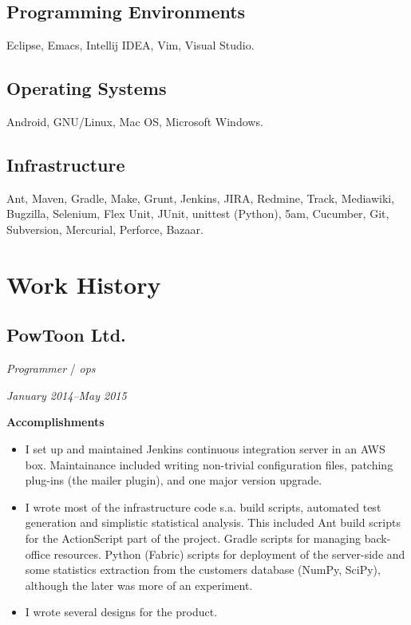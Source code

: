 \documentclass[11pt]{article}
\begin{document}
\subsection{Programming Environments}
\label{sec:orgheadline5}
Eclipse, Emacs, Intellij IDEA, Vim, Visual Studio.

\subsection{Operating Systems}
\label{sec:orgheadline6}
Android, GNU/Linux, Mac OS, Microsoft Windows.

\subsection{Infrastructure}
\label{sec:orgheadline7}
Ant, Maven, Gradle, Make, Grunt, Jenkins, JIRA, Redmine, Track, Mediawiki,
Bugzilla, Selenium, Flex Unit, JUnit, unittest (Python), 5am, Cucumber, Git,
Subversion, Mercurial, Perforce, Bazaar.

\clearpage

\section{Work History}
\label{sec:orgheadline12}

\subsection{PowToon Ltd.}
\label{sec:orgheadline9}
\begin{description}
\item[{Position}] \emph{Programmer} / \emph{ops}
\item[{Term}] \emph{January 2014--May 2015}
\item \textbf{Accomplishments}
\begin{itemize}
\item I set up and maintained Jenkins continuous integration server in
an AWS box.  Maintainance included writing non-trivial configuration
files, patching plug-ins (the mailer plugin), and one major version
upgrade.
\item I wrote most of the infrastructure code s.a. build scripts, automated
test generation and simplistic statistical analysis.  This included
Ant build scripts for the ActionScript part of the project.  Gradle
scripts for managing back-office resources.  Python (Fabric) scripts
for deployment of the server-side and some statistics extraction
from the customers database (NumPy, SciPy), although the later was
more of an experiment.
\item I wrote several designs for the product.
\end{itemize}
\end{description}
\end{document}
